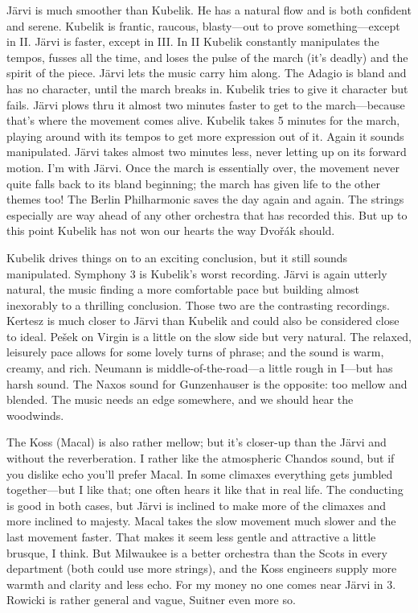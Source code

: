 \documentclass[12pt]{article}%
\begin{document}
Järvi is much smoother than Kubelik. He has a natural flow and is both confident and serene. Kubelik is frantic, raucous, blasty---out to prove something---except in II. Järvi is faster, except in III. 
In II Kubelik constantly manipulates the tempos, fusses all the time, 
and loses the pulse of the march (it's deadly) and the spirit of the piece. 
Järvi lets the music carry him along. The Adagio is bland and has no character, until the march breaks in.
Kubelik tries to give it character but fails. Järvi plows thru it almost two minutes
faster to get to the march---because that's where the movement comes alive.
Kubelik takes 5 minutes for the march, playing around with its tempos to get more
expression out of it. Again it sounds manipulated. Järvi takes almost two minutes less,
never letting up on its forward motion.
I'm with Järvi. Once the march is essentially
over, the movement never quite falls back to its bland beginning; the march has given life to the other themes too! The Berlin Philharmonic saves the day again and again. The strings especially are way ahead of any other orchestra that has recorded this. But up to this point Kubelik has not won our hearts the way Dvořák should.

Kubelik drives things on to an exciting conclusion, but it still sounds manipulated.
Symphony 3 is Kubelik's worst recording. Järvi is again utterly natural, the music finding a more comfortable pace but building almost inexorably to a thrilling conclusion.
Those two are the contrasting recordings.
Kertesz is much closer to Järvi than Kubelik and could also be considered close to ideal.
Pešek on Virgin is a little on the slow side but very natural. The relaxed, leisurely pace allows for some lovely turns of phrase; and the sound is warm, creamy, and rich. Neumann is middle-of-the-road---a little rough in I---but has harsh sound. The Naxos sound for Gunzenhauser is the opposite: too mellow and blended. The music needs an edge somewhere, and we should hear the woodwinds.

The Koss (Macal) is also rather mellow; but it's closer-up than the Järvi and without the reverberation. I rather like the atmospheric Chandos sound, but if you dislike echo you'll prefer Macal. In some climaxes everything gets jumbled together---but I like that; one often hears it like that in real life. The conducting is good in both cases, but Järvi is inclined to make more of the climaxes and more inclined to majesty. Macal takes the slow movement much slower and the last movement faster.
That makes it seem less gentle and attractive a little brusque, I think. But Milwaukee is a better orchestra than the Scots in every department (both could use more strings), and the Koss engineers supply more warmth and clarity and less echo. For my money no one comes near Järvi in 3. Rowicki is rather general and vague, Suitner even more so.
\end{document}
